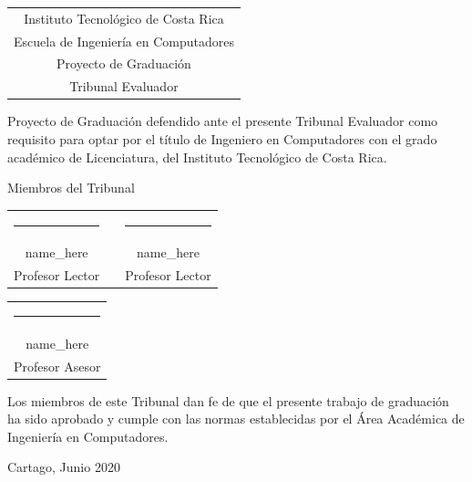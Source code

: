 \thispagestyle{empty}

\newcommand{\lectorI}{name_here}
\newcommand{\lectorII}{name_here}
\newcommand{\director}{name_here}


\begin{center}
  \begin{tabular}{c}
    Instituto Tecnológico de Costa Rica \\
    Escuela de Ingeniería en Computadores \\
    Proyecto de Graduación \\
    Tribunal Evaluador
  \end{tabular}
\end{center}

\vfill

Proyecto de Graduación defendido ante el presente Tribunal Evaluador como 
requisito para optar por el título de Ingeniero en Computadores con el grado 
académico de Licenciatura, del Instituto Tecnológico de Costa Rica.  

\vfill

\vspace*{20mm}
\begin{center}
 Miembros del Tribunal
\end{center}
\vspace*{8mm}

\vfill

\begin{center}
  \begin{tabular}{ccc}
    \rule{70mm}{0.5pt} & \rule{15mm}{0pt} & \rule{70mm}{0.5pt} \\
    \lectorI && \lectorII \\
    Profesor Lector && Profesor Lector
  \end{tabular}
  
  \vspace{10mm}

  \begin{tabular}{c}
    \rule{6cm}{0.5pt} \\
    \director \\
    Profesor Asesor
  \end{tabular}
\end{center}

\vfill


Los miembros de este Tribunal dan fe de que el presente trabajo de graduación
ha sido aprobado y cumple con las normas establecidas por el Área Académica de Ingeniería en Computadores.

\vfill

\begin{center}
  Cartago, Junio 2020\par
\end{center}


